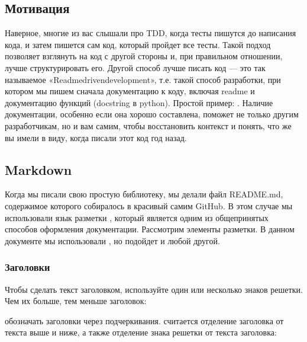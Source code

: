 \documentclass[letterpaper,10pt,russian]{sphinxmanual}
\begin{document}
\subsection{Мотивация}
\label{\detokenize{educational_materials/docs/content:id2}}
\sphinxAtStartPar
Наверное, многие из вас слышали про TDD, когда тесты пишутся до написания кода, и затем пишется сам код, который пройдет все тесты. Такой подход позволяет взглянуть на код с другой стороны и, при правильном отношении, лучше структурировать его. Другой способ лучше писать код — это так называемое «Readme\sphinxhyphen{}driven\sphinxhyphen{}development», т.е. такой способ разработки, при котором мы пишем сначала документацию к коду, включая readme и документацию функций (docstring в python). Простой пример: . Наличие документации, особенно если она хорошо составлена, поможет не только другим разработчикам, но и вам самим, чтобы восстановить контекст и понять, что же вы имели в виду, когда писали этот код год назад.


\subsection{Markdown}
\label{\detokenize{educational_materials/docs/content:markdown}}
\sphinxAtStartPar
Когда мы писали свою простую библиотеку, мы делали файл README.md, содержимое которого собиралось в красивый  самим GitHub. В этом случае мы использовали язык разметки , который является одним из общепринятых способов оформления документации. Рассмотрим элементы разметки. В данном документе мы использовали , но подойдет и любой другой.


\subsubsection{Заголовки}
\label{\detokenize{educational_materials/docs/content:id3}}
\sphinxAtStartPar
Чтобы сделать текст заголовком, используйте один или несколько знаков решетки. Чем их больше, тем меньше заголовок:

\sphinxAtStartPar
{}

\sphinxAtStartPar
{} обозначать заголовки через подчеркивания.  считается отделение заголовка от текста выше и ниже, а также отделение знака решетки от текста заголовка:
\end{document}
